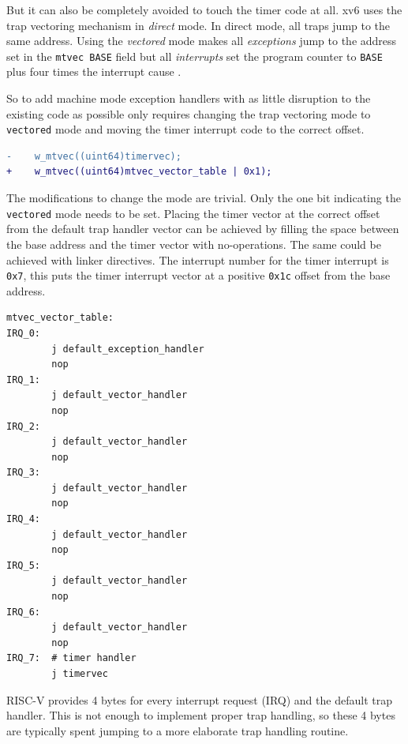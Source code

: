 But it can also be completely avoided to touch the timer code at all. xv6 uses the trap vectoring
mechanism in \textit{direct} mode. In direct mode, all traps jump to the same address.
Using the \textit{vectored} mode makes all \textit{exceptions} jump to the address set
in the \texttt{mtvec BASE} field but all \textit{interrupts} set the program counter
to \texttt{BASE} plus four times the interrupt cause \cite{RISCVInstructionSet}.

So to add machine mode exception handlers with as little disruption to the existing code as possible only
requires changing the trap vectoring mode to \texttt{vectored} mode and moving the timer interrupt code
to the correct offset.

\begin{lstlisting}[language=diff,basicstyle=\footnotesize,caption={\textbf{Changes to the mtvec write}}]
-    w_mtvec((uint64)timervec);
+    w_mtvec((uint64)mtvec_vector_table | 0x1);
\end{lstlisting}

The modifications to change the mode are trivial. Only the one bit indicating the \texttt{vectored} mode
needs to be set.
Placing the timer vector at the correct offset from the default trap handler vector can be achieved by
filling the space between the base address and the timer vector with no-operations. The same could be
achieved with linker directives.
The interrupt number for the timer interrupt is \texttt{0x7}, this puts the timer interrupt vector
at a positive \texttt{0x1c} offset from the base address.

\begin{lstlisting}[language={[RISC-V]Assembler},float=h!,basicstyle=\footnotesize,
    label={lst:defaultTrapHandler}, caption={Vectored Trap Handler Routine}]
mtvec_vector_table:
IRQ_0:
        j default_exception_handler
        nop
IRQ_1:
        j default_vector_handler
        nop
IRQ_2:
        j default_vector_handler
        nop
IRQ_3:
        j default_vector_handler
        nop
IRQ_4:
        j default_vector_handler
        nop
IRQ_5:
        j default_vector_handler
        nop
IRQ_6:
        j default_vector_handler
        nop
IRQ_7:  # timer handler
        j timervec
\end{lstlisting}


RISC-V provides 4 bytes for every interrupt request (IRQ) and the default trap handler. This is not enough
to implement proper trap handling, so these 4 bytes are typically spent jumping to a more elaborate trap
handling routine.


